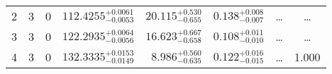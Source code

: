 \begin{table*}[!]
\begin{tabular}{llcrrlrc}
2 & 3 & 0 & $    112.4255_{-      0.0053}^{+      0.0061}$ & $      20.115_{-       0.655}^{+       0.530}$ & $       0.138_{-       0.007}^{+       0.008}$ & \multicolumn{1}{c}{\dots} & \dots \\[1pt]
3 & 3 & 0 & $    122.2935_{-      0.0056}^{+      0.0064}$ & $      16.623_{-       0.658}^{+       0.667}$ & $       0.108_{-       0.010}^{+       0.011}$ & \multicolumn{1}{c}{\dots} & \dots \\[1pt]
4 & 3 & 0 & $    132.3335_{-      0.0149}^{+      0.0153}$ & $       8.986_{-       0.635}^{+       0.560}$ & $       0.122_{-       0.015}^{+       0.016}$ & \multicolumn{1}{c}{\dots} & 1.000\\[1pt]
\hline
\end{tabular}
\end{table*}
